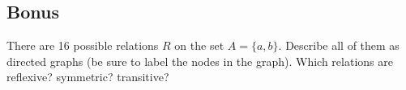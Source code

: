 \begin{questions}
\section*{Bonus}

\bonusquestion[2]   There are 16 possible relations $R$ on the set $A = \{a, b\}$.  Describe all of them as directed graphs (be sure to label the nodes in the graph).  Which relations are reflexive? symmetric? transitive?

\begin{solution}


\end{solution}

\end{questions}


